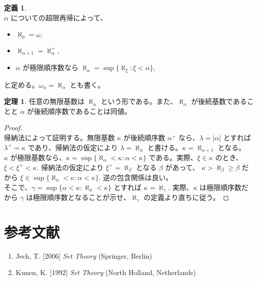 \documentclass{jsarticle}
\theoremstyle{definition}
\newtheorem*{definition*}{定義}
\newtheorem{theorem}{定理}[section]
\begin{document}
    \begin{definition*} \ \\
        $\alpha$ についての超限再帰によって、
        \begin{itemize}
            \item $\aleph_0 = \omega,$
            \item $\aleph_{\alpha+1} = \aleph_\alpha^+,$
            \item $\alpha$ が極限順序数なら $\aleph_\alpha = \sup \{\aleph_\xi : \xi < \alpha\},$
        \end{itemize}
        と定める。$\omega_\alpha = \aleph_\alpha$ とも書く。
    \end{definition*}
    
    \begin{theorem}
        任意の無限基数は $\aleph_\alpha$ という形である。また、$\aleph_\alpha$ が後続基数であることと $\alpha$ が後続順序数であることは同値。
    \end{theorem}
    \begin{proof} \ \\
        帰納法によって証明する。無限基数 $\kappa$ が後続順序数 $\alpha^+$ なら、$\lambda = |\alpha|$ とすれば $\lambda^+ = \kappa$ であり、帰納法の仮定により $\lambda = \aleph_\alpha$ と書ける。$\kappa = \aleph_{\alpha+1}$ となる。\\
        $\kappa$ が極限基数なら、$\kappa = \sup \{\aleph_\alpha < \kappa : \alpha < \kappa\}$ である。実際、$\xi \in \kappa$ のとき、$\xi < \xi^+ < \kappa.$ 帰納法の仮定により $\xi^+ = \aleph_\beta$ となる $\beta$ があって、 $\kappa > \aleph_\beta \geq \beta$ だから $\xi \in \sup \{\aleph_\alpha < \kappa : \alpha < \kappa\}.$ 逆の包含関係は良い。\\
        そこで、$\gamma = \sup \{\alpha < \kappa : \aleph_\alpha < \kappa\}$ とすれば $\kappa = \aleph_\gamma.$ 実際、$\kappa$ は極限順序数だから $\gamma$ は極限順序数となることが示せ、$\aleph_\gamma$ の定義より直ちに従う。
    \end{proof}
    
    \section{参考文献}
    \begin{enumerate}[]
        \item Jech, T. [2006] {\it Set Theory} (Springer, Berlin)
        \item Kunen, K. [1992] {\it Set Theory} (North Holland, Netherlands)
    \end{enumerate}
\end{document}
